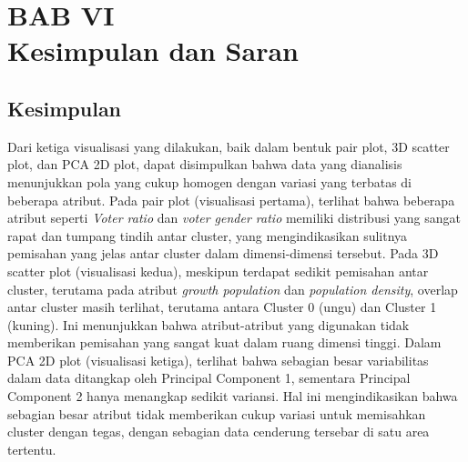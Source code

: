 \newpage
\section*{\centering BAB VI \\ Kesimpulan dan Saran }


\setcounter{section}{6}
\setcounter{subsection}{0}  %
\setcounter{figure}{0}
\setcounter{table}{0}
\setcounter{lstlisting}{0}
\renewcommand{\thetable}{\thesection.\arabic{table}}
\renewcommand{\thefigure}{\thesection.\arabic{figure}}
\renewcommand{\thelstlisting}{\thesection.\arabic{lstlisting}}

\subsection{Kesimpulan}
Dari ketiga visualisasi yang dilakukan, baik dalam bentuk pair plot, 3D scatter plot, dan PCA 2D plot, dapat disimpulkan bahwa data yang dianalisis menunjukkan pola yang cukup homogen dengan variasi yang terbatas di beberapa atribut. Pada pair plot (visualisasi pertama), terlihat bahwa beberapa atribut seperti \textit{Voter ratio} dan \textit{voter gender ratio} memiliki distribusi yang sangat rapat dan tumpang tindih antar cluster, yang mengindikasikan sulitnya pemisahan yang jelas antar cluster dalam dimensi-dimensi tersebut. Pada 3D scatter plot (visualisasi kedua), meskipun terdapat sedikit pemisahan antar cluster, terutama pada atribut \textit{growth population} dan \textit{population density}, overlap antar cluster masih terlihat, terutama antara Cluster 0 (ungu) dan Cluster 1 (kuning). Ini menunjukkan bahwa atribut-atribut yang digunakan tidak memberikan pemisahan yang sangat kuat dalam ruang dimensi tinggi. Dalam PCA 2D plot (visualisasi ketiga), terlihat bahwa sebagian besar variabilitas dalam data ditangkap oleh Principal Component 1, sementara Principal Component 2 hanya menangkap sedikit variansi. Hal ini mengindikasikan bahwa sebagian besar atribut tidak memberikan cukup variasi untuk memisahkan cluster dengan tegas, dengan sebagian data cenderung tersebar di satu area tertentu.

